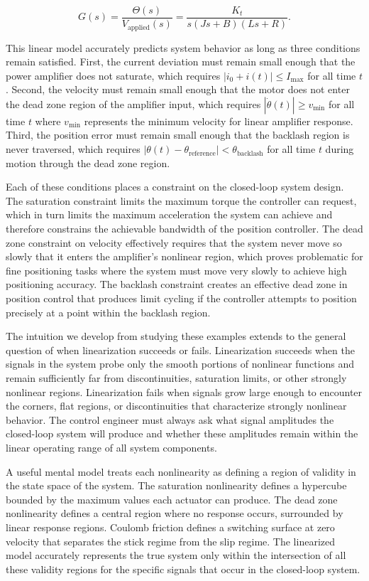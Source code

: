 \[
G(s) = \frac{\Theta(s)}{V_{\text{applied}}(s)} = \frac{K_t}{s(J s + B)(L s + R)}.
\]

This linear model accurately predicts system behavior as long as three conditions remain satisfied. First, the current deviation must remain small enough that the power amplifier does not saturate, which requires $|i_0 + i(t)| \leq I_{\max}$ for all time $t$. Second, the velocity must remain small enough that the motor does not enter the dead zone region of the amplifier input, which requires $|\dot{\theta}(t)| \geq v_{\min}$ for all time $t$ where $v_{\min}$ represents the minimum velocity for linear amplifier response. Third, the position error must remain small enough that the backlash region is never traversed, which requires $|\theta(t) - \theta_{\text{reference}}| < \theta_{\text{backlash}}$ for all time $t$ during motion through the dead zone region.

Each of these conditions places a constraint on the closed-loop system design. The saturation constraint limits the maximum torque the controller can request, which in turn limits the maximum acceleration the system can achieve and therefore constrains the achievable bandwidth of the position controller. The dead zone constraint on velocity effectively requires that the system never move so slowly that it enters the amplifier's nonlinear region, which proves problematic for fine positioning tasks where the system must move very slowly to achieve high positioning accuracy. The backlash constraint creates an effective dead zone in position control that produces limit cycling if the controller attempts to position precisely at a point within the backlash region.

The intuition we develop from studying these examples extends to the general question of when linearization succeeds or fails. Linearization succeeds when the signals in the system probe only the smooth portions of nonlinear functions and remain sufficiently far from discontinuities, saturation limits, or other strongly nonlinear regions. Linearization fails when signals grow large enough to encounter the corners, flat regions, or discontinuities that characterize strongly nonlinear behavior. The control engineer must always ask what signal amplitudes the closed-loop system will produce and whether these amplitudes remain within the linear operating range of all system components.

A useful mental model treats each nonlinearity as defining a region of validity in the state space of the system. The saturation nonlinearity defines a hypercube bounded by the maximum values each actuator can produce. The dead zone nonlinearity defines a central region where no response occurs, surrounded by linear response regions. Coulomb friction defines a switching surface at zero velocity that separates the stick regime from the slip regime. The linearized model accurately represents the true system only within the intersection of all these validity regions for the specific signals that occur in the closed-loop system.

